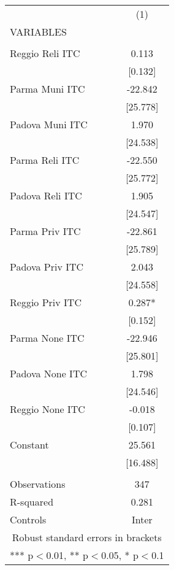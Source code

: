 \begin{tabular}{lc} \hline
 & (1) \\
VARIABLES &  \\ \hline
 &  \\
Reggio Reli ITC & 0.113 \\
 & [0.132] \\
Parma Muni ITC & -22.842 \\
 & [25.778] \\
Padova Muni ITC & 1.970 \\
 & [24.538] \\
Parma Reli ITC & -22.550 \\
 & [25.772] \\
Padova Reli ITC & 1.905 \\
 & [24.547] \\
Parma Priv ITC & -22.861 \\
 & [25.789] \\
Padova Priv ITC & 2.043 \\
 & [24.558] \\
Reggio Priv ITC & 0.287* \\
 & [0.152] \\
Parma None ITC & -22.946 \\
 & [25.801] \\
Padova None ITC & 1.798 \\
 & [24.546] \\
Reggio None ITC & -0.018 \\
 & [0.107] \\
Constant & 25.561 \\
 & [16.488] \\
 &  \\
Observations & 347 \\
R-squared & 0.281 \\
 Controls & Inter \\ \hline
\multicolumn{2}{c}{ Robust standard errors in brackets} \\
\multicolumn{2}{c}{ *** p$<$0.01, ** p$<$0.05, * p$<$0.1} \\
\end{tabular}
